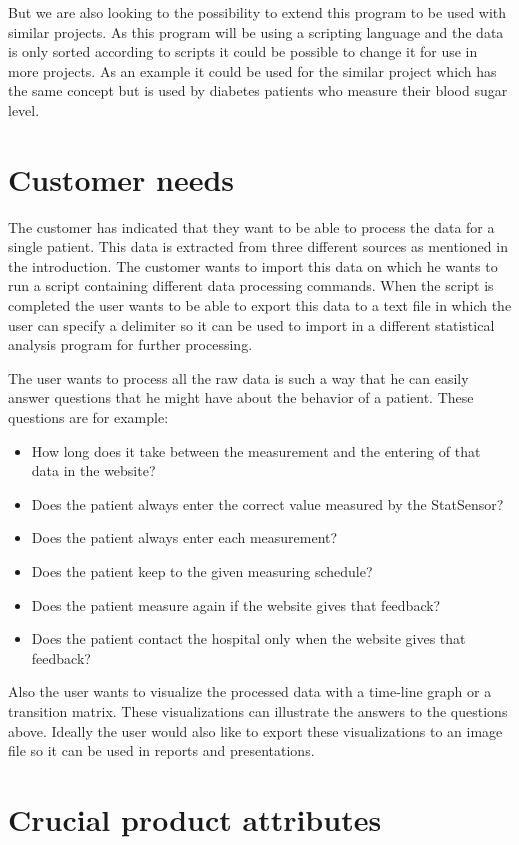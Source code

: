 \documentclass[11pt,twoside,a4paper]{article}
\begin{document}
But we are also looking to the possibility to extend this program to be used with similar projects. As this program will be using a scripting language and the data is only sorted according to scripts it could be possible to change it for use in more projects. As an example it could be used for the similar project which has the same concept but is used by diabetes patients who measure their blood sugar level.


\section{Customer needs}

The customer has indicated that they want to be able to process the data for a single patient. This data is extracted from three different sources as mentioned in the introduction. The customer wants to import this data on which he wants to run a script containing different data processing commands. When the script is completed the user wants to be able to export this data to a text file in which the user can specify a delimiter so it can be used to import in a different statistical analysis program for further processing. 

The user wants to process all the raw data is such a way that he can easily answer questions that he might have about the behavior of a patient. These questions are for example:
\begin{itemize}
\item How long does it take between the measurement and the entering of that data in the website?
\item Does the patient always enter the correct value measured by the StatSensor?
\item Does the patient always enter each measurement?
\item Does the patient keep to the given measuring schedule?
\item Does the patient measure again if the website gives that feedback?
\item Does the patient contact the hospital only when the website gives that feedback?
\end{itemize}
Also the user wants to visualize the processed data with a time-line graph or a transition matrix. These visualizations can illustrate the answers to the questions above. Ideally the user would also like to export these visualizations to an image file so it can be used in reports and presentations.

\section{Crucial product attributes}
\end{document}

